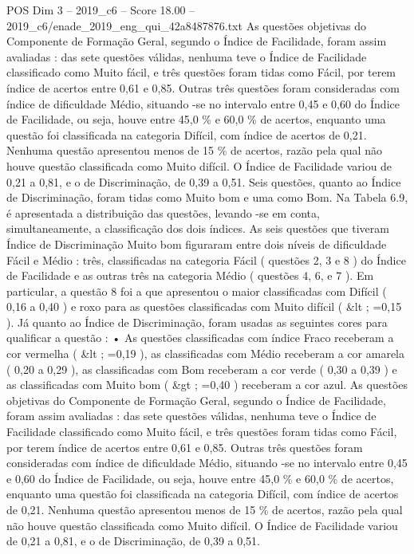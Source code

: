 \begin{textsample}{POS Dim 3 – 2019\_c6 – Score 18.00 – 2019\_c6/enade\_2019\_eng\_qui\_42a8487876.txt}
As questões objetivas do Componente de Formação Geral, segundo o Índice de Facilidade, foram assim avaliadas : das sete questões válidas, nenhuma teve o Índice de Facilidade classificado como Muito fácil, e três questões foram tidas como Fácil, por terem índice de acertos entre 0,61 e 0,85.
Outras três questões foram consideradas com índice de dificuldade Médio, situando -se no intervalo entre 0,45 e 0,60 do Índice de Facilidade, ou seja, houve entre 45,0 \% e 60,0 \% de acertos, enquanto uma questão foi classificada na categoria Difícil, com índice de acertos de 0,21.
Nenhuma questão apresentou menos de 15 \% de acertos, razão pela qual não houve questão classificada como Muito difícil.
O Índice de Facilidade variou de 0,21 a 0,81, e o de Discriminação, de 0,39 a 0,51.
Seis questões, quanto ao Índice de Discriminação, foram tidas como Muito bom e uma como Bom.
Na Tabela 6.9, é apresentada a distribuição das questões, levando -se em conta, simultaneamente, a classificação dos dois índices.
As seis questões que tiveram Índice de Discriminação Muito bom figuraram entre dois níveis de dificuldade Fácil e Médio : três, classificadas na categoria Fácil ( questões 2, 3 e 8 ) do Índice de Facilidade e as outras três na categoria Médio ( questões 4, 6, e 7 ).
Em particular, a questão 8 foi a que apresentou o maior classificadas com Difícil ( 0,16 a 0,40 ) e roxo para as questões classificadas com Muito difícil ( \&lt ; =0,15 ).
Já quanto ao Índice de Discriminação, foram usadas as seguintes cores para qualificar a questão : • As questões classificadas com índice Fraco receberam a cor vermelha ( \&lt ; =0,19 ), as classificadas com Médio receberam a cor amarela ( 0,20 a 0,29 ), as classificadas com Bom receberam a cor verde ( 0,30 a 0,39 ) e as classificadas com Muito bom ( \&gt ; =0,40 ) receberam a cor azul.
As questões objetivas do Componente de Formação Geral, segundo o Índice de Facilidade, foram assim avaliadas : das sete questões válidas, nenhuma teve o Índice de Facilidade classificado como Muito fácil, e três questões foram tidas como Fácil, por terem índice de acertos entre 0,61 e 0,85.
Outras três questões foram consideradas com índice de dificuldade Médio, situando -se no intervalo entre 0,45 e 0,60 do Índice de Facilidade, ou seja, houve entre 45,0 \% e 60,0 \% de acertos, enquanto uma questão foi classificada na categoria Difícil, com índice de acertos de 0,21.
Nenhuma questão apresentou menos de 15 \% de acertos, razão pela qual não houve questão classificada como Muito difícil.
O Índice de Facilidade variou de 0,21 a 0,81, e o de Discriminação, de 0,39 a 0,51.

\end{textsample}
